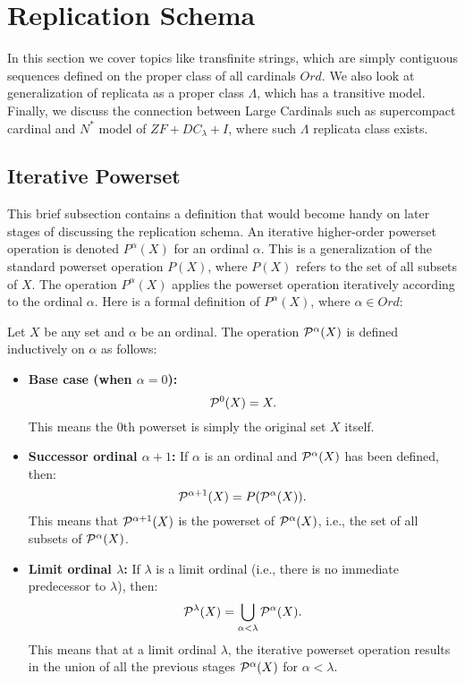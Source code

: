 \pagebreak
\section{Replication Schema}\label{section_replication_schema}

In this section we cover topics like transfinite strings, which are simply contiguous sequences defined on the proper class of all cardinals $Ord$. We also look at generalization of replicata as a proper class $\Lambda$, which has a transitive model. Finally, we discuss the connection between Large Cardinals such as supercompact cardinal and $N^\ast$ model of $ZF+DC_\lambda+I$, where such $\Lambda$ replicata class exists.

\subsection{Iterative Powerset}

This brief subsection contains a definition that would become handy on later stages of discussing the replication schema. An iterative higher-order powerset operation is denoted \( P^\alpha(X) \) for an ordinal \( \alpha \). This is a generalization of the standard powerset operation \( P(X) \), where \( P(X) \) refers to the set of all subsets of \( X \). The operation \( P^\alpha(X) \) applies the powerset operation iteratively according to the ordinal \( \alpha \). Here is a formal definition of \( P^\alpha(X) \), where \( \alpha \in Ord \):

\begin{definition}\label{def_iter_pset}

    Let \( X \) be any set and \( \alpha \) be an ordinal. The operation \( \mathcal{P}^\alpha(X) \) is defined inductively on \( \alpha \) as follows:
    
    \begin{itemize}
        \item \textbf{Base case (when \( \alpha = 0 \)):}
        \[
        \mathcal{P}^0(X) = X.
        \]
        This means the 0th powerset is simply the original set \( X \) itself.
    
        \item \textbf{Successor ordinal \( \alpha + 1 \):} If \( \alpha \) is an ordinal and \( \mathcal{P}^\alpha(X) \) has been defined, then:
        \[
        \mathcal{P}^{\alpha+1}(X) = P(\mathcal{P}^\alpha(X)).
        \]
        This means that \( \mathcal{P}^{\alpha+1}(X) \) is the powerset of \( \mathcal{P}^\alpha(X) \), i.e., the set of all subsets of \( \mathcal{P}^\alpha(X) \).
    
        \item \textbf{Limit ordinal \( \lambda \):} If \( \lambda \) is a limit ordinal (i.e., there is no immediate predecessor to \( \lambda \)), then:
        \[
        \mathcal{P}^\lambda(X) = \bigcup_{\alpha < \lambda} \mathcal{P}^\alpha(X).
        \]
        This means that at a limit ordinal \( \lambda \), the iterative powerset operation results in the union of all the previous stages \( \mathcal{P}^\alpha(X) \) for \( \alpha < \lambda \).
    \end{itemize}
\end{definition}

